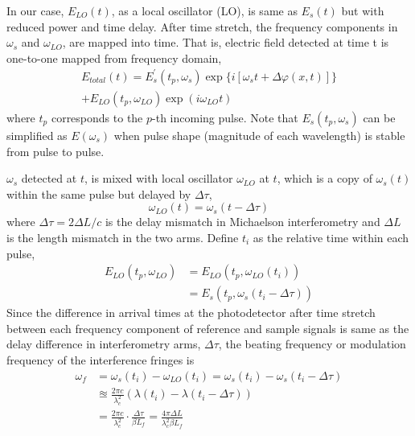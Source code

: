\documentclass[aps,pra,reprint,superscriptaddress]{revtex4-1}
\begin{document}
In our case, $E_{LO}(t)$, as a local oscillator (LO), is same as $E_s(t)$ but with reduced power and time delay. After time stretch, the frequency components in $\omega_s$ and $\omega_{LO}$, are mapped into time. That is, electric field detected at time t is one-to-one mapped from frequency domain,
\begin{multline}
E_{total}(t) = E_s^\prime(t_p,\omega_s) \exp \lbrace i[\omega_s t+\Delta\varphi(x,t)] \rbrace\\
+ E_{LO}(t_p,\omega_{LO}) \exp(i\omega_{LO} t)
\end{multline}
where $t_p$ corresponds to the $p$-th incoming pulse. Note that $E_s(t_p,\omega_s)$ can be simplified as $E(\omega_s)$ when pulse shape (magnitude of each wavelength) is stable from pulse to pulse.

$\omega_s$ detected at $t$, is mixed with local oscillator $\omega_{LO}$ at $t$, which is a copy of $\omega_s(t)$ within the same pulse but delayed by $\Delta\tau$,
\begin{equation}
\omega_{LO}(t) = \omega_s(t-\Delta\tau)
\end{equation}
where $\Delta\tau = 2 \Delta L/c$ is the delay mismatch in Michaelson interferometry and $\Delta L$ is the length mismatch in the two arms. Define $t_i$ as the relative time within each pulse,
\begin{equation}\label{eq:sandLO}
\begin{split}
E_{LO}(t_p,\omega_{LO}) &= E_{LO}(t_p,\omega_{LO}(t_i)) \\
&= E_s(t_p,\omega_s(t_i-\Delta\tau))
\end{split}
\end{equation}
Since the difference in arrival times at the photodetector after time stretch between each frequency component of reference and sample signals is same as the delay difference in interferometry arms, $\Delta\tau$, the beating frequency or modulation frequency of the interference fringes is
\begin{align}
\omega_f & = \omega_s(t_i ) - \omega_{LO}(t_i ) = \omega_s(t_i ) - \omega_s(t_i-\Delta\tau)\\
& \approxeq \frac{2\pi c}{\lambda_c^2} (\lambda(t_i) - \lambda(t_i-\Delta\tau))\\
& = \frac{2\pi c}{\lambda_c^2} \cdot \frac{\Delta\tau}{\beta L_f} = \frac{4\pi\Delta L}{\lambda_c^2 \beta L_f}
\end{align}
\end{document}
